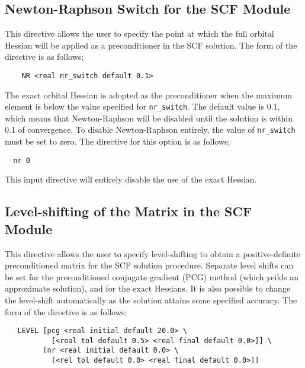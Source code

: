 \subsection{Newton-Raphson Switch for the SCF Module}
\label{sec:nrswitch}

This directive allows the user to specify the point at which the full orbital 
Hessian will be applied as a preconditioner in the SCF solution.  The form
of the directive is as follows;

\begin{verbatim}
    NR <real nr_switch default 0.1>
\end{verbatim}

The exact orbital Hessian is adopted as the preconditioner
when the maximum element is below the value specified for \verb+nr_switch+.
The default value is 0.1, which means that Newton-Raphson will be disabled
until the solution is within 0.1 of convergence.  To disable Newton-Raphson
entirely, the value of \verb+nr_switch+ must be set to zero.  The directive
for this option is as follows;

\begin{verbatim}
  nr 0
\end{verbatim}

This input directive will entirely disable the use of the exact Hessian.

\subsection{Level-shifting of the Matrix in the SCF Module}
\label{sec:level}

This directive allows the user to specify level-shifting to obtain a
positive-definite preconditioned matrix for the SCF solution procedure.  
Separate level shifts can be set for the preconditioned conjugate
gradient (PCG) method (which yeilds an approximate solution), and for the
exact Hessians.  It is also possible to change the level-shift automatically
as the solution attains some specified accuracy.  The form of the 
directive is as follows;

\begin{verbatim}
   LEVEL [pcg <real initial default 20.0> \
           [<real tol default 0.5> <real final default 0.0>]] \
         [nr <real initial default 0.0> \
           [<rel tol default 0.0> <real final default 0.0>]]
\end{verbatim}


